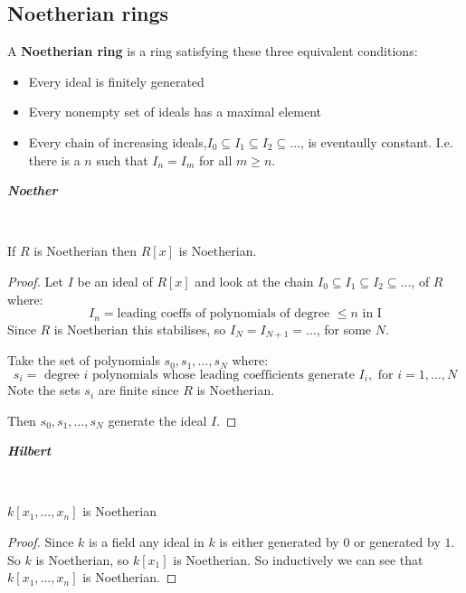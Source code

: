 \subsection{Noetherian rings}
\begin{definition}
    A \textbf{Noetherian ring} is a ring satisfying these three equivalent conditions:\begin{itemize}
        \item Every ideal is finitely generated
        \item Every nonempty set of ideals has a maximal element
        \item Every chain of increasing ideals,$I_0\subseteq I_1\subseteq I_2\subseteq \dots$, is eventaully constant. I.e. there is a $n$ such that $I_n=I_m$ for all $m\geq n$. 
    \end{itemize}
\end{definition}
\begin{theorem} \textbf{\textit{Noether}}

    \

    If $R$ is Noetherian then $R[x]$ is Noetherian.
    \begin{proof}
        Let $I$ be an ideal of $R[x]$ and look at the chain $I_0\subseteq I_1\subseteq I_2\subseteq \dots$, of $R$ where:\begin{equation*}
            I_n = \text{leading coeffs of polynomials of degree }\leq n\text{ in I}
        \end{equation*}
Since $R$ is Noetherian this stabilises, so $I_N=I_{N+1}=\dots$, for some $N$.

Take the set of polynomials $s_0,s_1,\dots,s_N$ where:\begin{equation*}
    s_i= \text{ degree }i\text{ polynomials whose leading coefficients generate }I_i, \text{ for }i=1,\dots,N
\end{equation*}
Note the sets $s_i$ are finite since $R$ is Noetherian.


Then $s_0,s_1,\dots,s_N$ generate the ideal $I$.
    \end{proof}
\end{theorem}
\begin{corollary} \textbf{\textit{Hilbert}}

    \

    $k[x_1,\dots,x_n]$ is Noetherian

    \begin{proof}
        Since $k$ is a field any ideal in $k$ is either generated by $0$ or generated by $1$. So $k$ is Noetherian, so $k[x_1]$ is Noetherian.
        So inductively we can see that $k[x_1,\dots,x_n]$ is Noetherian.
    \end{proof}
\end{corollary}

